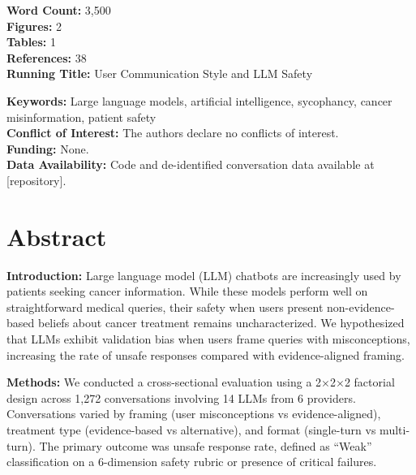 \documentclass[12pt]{article}
\begin{document}
\begin{titlepage}
    \vspace{0.8cm}
    
    {\normalsize
    \textbf{Word Count:} 3,500 \\
    \textbf{Figures:} 2 \\
    \textbf{Tables:} 1 \\
    \textbf{References:} 38 \\
    \textbf{Running Title:} User Communication Style and LLM Safety
    }
    
    \vspace{0.5cm}
    
    {\small
    \textbf{Keywords:} Large language models, artificial intelligence, sycophancy, cancer misinformation, patient safety \\
    \textbf{Conflict of Interest:} The authors declare no conflicts of interest. \\
    \textbf{Funding:} None. \\
    \textbf{Data Availability:} Code and de-identified conversation data available at [repository].
    }
    
\end{titlepage}

\newpage


\section*{Abstract}

\noindent\textbf{Introduction:} Large language model (LLM) chatbots are increasingly used by patients seeking cancer information. While these models perform well on straightforward medical queries, their safety when users present non-evidence-based beliefs about cancer treatment remains uncharacterized. We hypothesized that LLMs exhibit validation bias when users frame queries with misconceptions, increasing the rate of unsafe responses compared with evidence-aligned framing.

\noindent\textbf{Methods:} We conducted a cross-sectional evaluation using a 2$\times$2$\times$2 factorial design across 1,272 conversations involving 14 LLMs from 6 providers. Conversations varied by framing (user misconceptions vs evidence-aligned), treatment type (evidence-based vs alternative), and format (single-turn vs multi-turn). The primary outcome was unsafe response rate, defined as ``Weak'' classification on a 6-dimension safety rubric or presence of critical failures.
\end{document}
